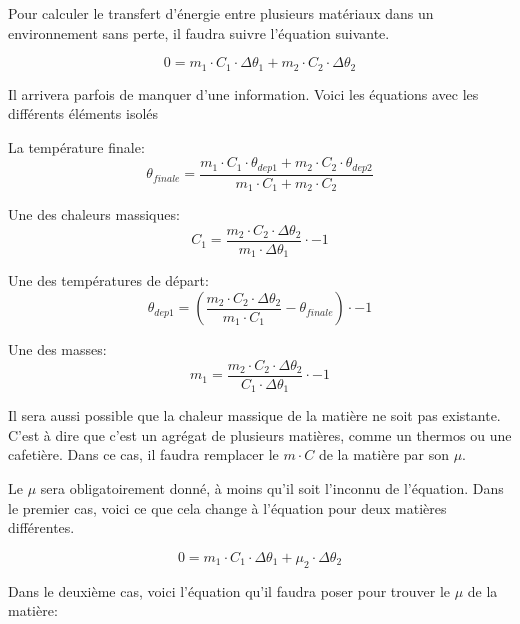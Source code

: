 \documentclass{article}
\begin{document}
Pour calculer le transfert d'énergie entre plusieurs matériaux dans un environnement sans perte, il faudra suivre l'équation suivante.

\begin{equation}
	0 = m_1 \cdot C_1 \cdot \Delta\theta_1 + m_2 \cdot C_2 \cdot \Delta\theta_2
\end{equation}

Il arrivera parfois de manquer d'une information. Voici les équations avec les différents éléments isolés

La température finale:
\begin{equation}
	\theta_{finale} = \frac{m_1 \cdot C_1 \cdot \theta_{dep1} + m_2 \cdot C_2 \cdot \theta_{dep2}}{m_1 \cdot C_1 + m_2 \cdot C_2}
\end{equation}

Une des chaleurs massiques:
\begin{equation}
	C_1 = \frac{m_2 \cdot C_2 \cdot \Delta\theta_2}{m_1 \cdot \Delta\theta_1} \cdot -1
\end{equation}

Une des températures de départ:
\begin{equation}
	\theta_{dep1} = (\frac{m_2 \cdot C_2 \cdot \Delta\theta_2}{m_1 \cdot C_1} - \theta_{finale}) \cdot -1
\end{equation}

Une des masses:
\begin{equation}
	m_1 = \frac{m_2 \cdot C_2 \cdot \Delta\theta_2}{C_1 \cdot \Delta\theta_1} \cdot -1
\end{equation}

Il sera aussi possible que la chaleur massique de la matière ne soit pas existante. C'est à dire que c'est un agrégat de plusieurs matières, comme un thermos ou une cafetière. Dans ce cas, il faudra remplacer le $m \cdot C$ de la matière par son $\mu$.

Le $\mu$ sera obligatoirement donné, à moins qu'il soit l'inconnu de l'équation. Dans le premier cas, voici ce que cela change à l'équation pour deux matières différentes.

\begin{equation}
	0 = m_1 \cdot C_1 \cdot \Delta\theta_1 + \mu_2 \cdot \Delta\theta_2
\end{equation}

Dans le deuxième cas, voici l'équation qu'il faudra poser pour trouver le $\mu$ de la matière:
\end{document}
